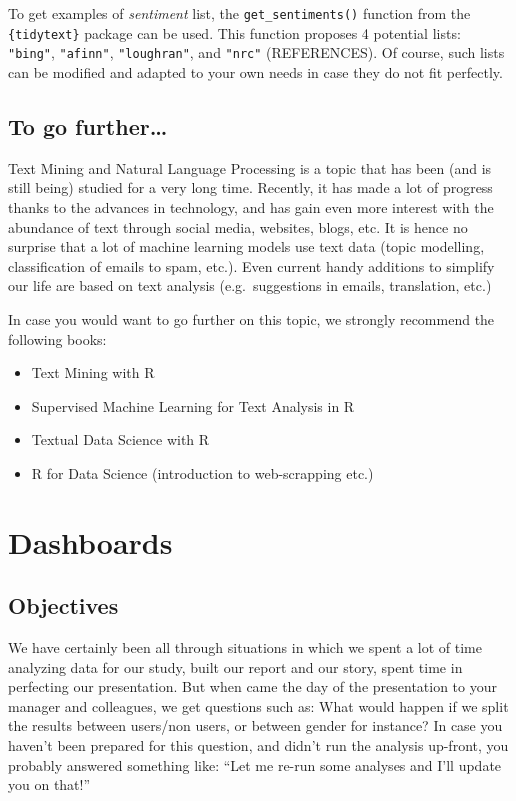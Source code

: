 \documentclass[
]{book}
\providecommand{\tightlist}{%
  \setlength{\itemsep}{0pt}\setlength{\parskip}{0pt}}
\begin{document}
To get examples of \emph{sentiment} list, the \texttt{get\_sentiments()} function from the \texttt{\{tidytext\}} package can be used. This function proposes 4 potential lists: \texttt{"bing"}, \texttt{"afinn"}, \texttt{"loughran"}, and \texttt{"nrc"} (REFERENCES). Of course, such lists can be modified and adapted to your own needs in case they do not fit perfectly.

\hypertarget{to-go-further-1}{%
\section{To go further\ldots{}}\label{to-go-further-1}}

Text Mining and Natural Language Processing is a topic that has been (and is still being) studied for a very long time. Recently, it has made a lot of progress thanks to the advances in technology, and has gain even more interest with the abundance of text through social media, websites, blogs, etc. It is hence no surprise that a lot of machine learning models use text data (topic modelling, classification of emails to spam, etc.). Even current handy additions to simplify our life are based on text analysis (e.g.~suggestions in emails, translation, etc.)

In case you would want to go further on this topic, we strongly recommend the following books:

\begin{itemize}
\tightlist
\item
  Text Mining with R
\item
  Supervised Machine Learning for Text Analysis in R
\item
  Textual Data Science with R
\item
  R for Data Science (introduction to web-scrapping etc.)
\end{itemize}

\hypertarget{dashboards}{%
\chapter{Dashboards}\label{dashboards}}

\hypertarget{objectives}{%
\section{Objectives}\label{objectives}}

We have certainly been all through situations in which we spent a lot of time analyzing data for our study, built our report and our story, spent time in perfecting our presentation. But when came the day of the presentation to your manager and colleagues, we get questions such as: What would happen if we split the results between users/non users, or between gender for instance? In case you haven't been prepared for this question, and didn't run the analysis up-front, you probably answered something like: ``Let me re-run some analyses and I'll update you on that!''
\end{document}
